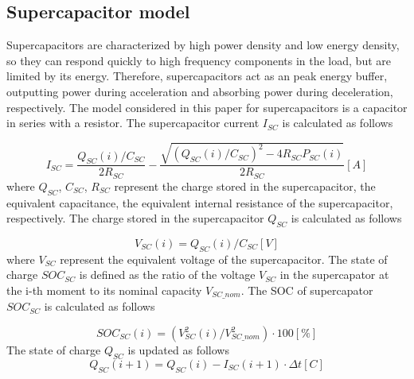 \documentclass[energies,article,submit,moreauthors,pdftex,10pt,a4paper]{Definitions/mdpi}
\begin{document}
\subsection{Supercapacitor model}
Supercapacitors are characterized by high power density and low energy density, so they can respond quickly to high frequency components in the load, but are limited by its energy. Therefore, supercapacitors act as an peak energy buffer, outputting power during acceleration and absorbing power during deceleration,  respectively. The model considered in this paper for supercapacitors is a capacitor in series with a resistor. The supercapacitor current ${I_{SC}}$ is calculated as follows 

\begin{equation}
{I_{SC}} = \frac{{{Q_{SC}}\left( i \right)/{C_{SC}}}}{{2{R_{SC}}}} - \frac{{\sqrt {{{\left( {{Q_{SC}}\left( i \right)/{C_{SC}}} \right)}^2} - 4{R_{SC}}{P_{SC}}\left( i \right)} }}{{2{R_{SC}}}}\left[ A \right]
\end{equation}
where ${Q_{SC}}$, ${C_{SC}}$, ${R_{SC}}$ represent the charge stored in the supercapacitor, the equivalent capacitance, the equivalent internal resistance of the supercapacitor,  respectively. The charge stored in the supercapacitor ${Q_{SC}}$ is calculated as follows

\begin{equation}
{V_{SC}}\left( i \right) = {Q_{SC}}\left( i \right)/{C_{SC}}[V]
\end{equation}
where ${V_{SC}}$ represent the equivalent voltage of the supercapacitor. The state of charge $SO{C_{SC}}$ is defined as the ratio of the voltage ${V_{SC}}$ in the supercapator at the i-th moment to its nominal capacity ${V_{SC\_nom}}$. The SOC of supercapator $SO{C_{SC}}$ is calculated as follows

\begin{equation}
SO{C_{SC}}\left( i \right) = \left( {V_{SC}^2\left( i \right)/V_{SC\_nom}^2} \right) \cdot 100\left[ \%  \right]
\end{equation}
The  state of charge ${Q_{SC}} $ is updated as follows
\begin{equation}
{Q_{SC}}\left( {i + 1} \right) = {Q_{SC}}\left( i \right) - {I_{SC}}\left( {i + 1} \right) \cdot \Delta t\left[ C \right]
\end{equation}
\end{document}
